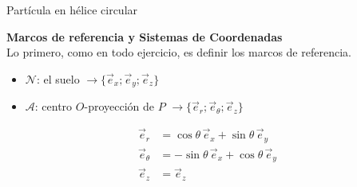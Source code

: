 \begin{solucion}{Partícula en hélice circular}

\textbf{Marcos de referencia y Sistemas de Coordenadas}\\
Lo primero, como en todo ejercicio, es definir los marcos de referencia.
\begin{itemize}
    \item $\mathcal{N}$: el suelo $\longrightarrow\{\vec{e}_x;\vec{e}_y;\vec{e}_z\}$
    \item $\mathcal{A}$: centro $O$-proyección de $P$ $\longrightarrow\{\vec{e}_r;\vec{e}_\theta;\vec{e}_z\}$
\end{itemize}

\begin{center}
\end{center}

\begin{equation*}
\begin{split}
    \vec{e}_r&=\cos\theta\,\vec{e}_x+\sin\theta\,\vec{e}_y\\
    \vec{e}_\theta&=-\sin\theta\,\vec{e}_x+\cos\theta\,\vec{e}_y\\
    \vec{e}_z&=\vec{e}_z
\end{split}
\end{equation*}


\end{solucion}
